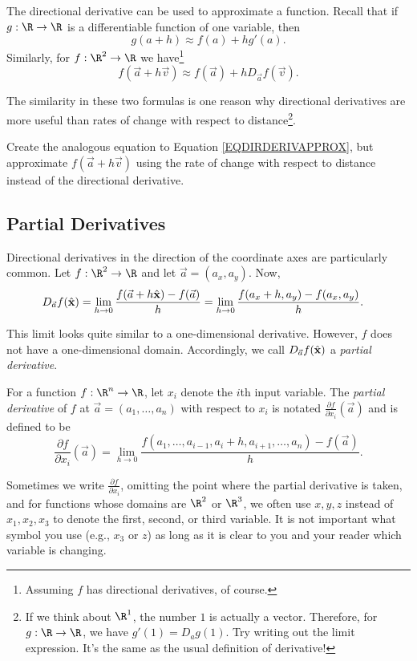 The directional derivative can be used to approximate a function.  Recall that if $g:\R\to\R$ is
a differentiable function of one variable, then
\[
	g(a+h)\approx f(a) + hg'(a).
\]
Similarly, for $f:\R^2\to\R$ we have\footnote{ Assuming $f$ has directional derivatives, of course.}
\begin{equation}
	\label{EQDIRDERIVAPPROX}
	f(\vec a+h\vec v)\approx f(\vec a)+hD_{\vec a}f(\vec v).
\end{equation}

The similarity in these two formulas is one reason
why directional derivatives are more useful than rates of change with respect to distance\footnote{
	If we think about $\R^1$, the number $1$ is actually a vector.  Therefore,
	for $g:\R\to\R$, we have $g'(1)=D_{a}g(1)$.  Try writing out the limit expression.  It's the same
	as the usual definition of derivative!
	}.

\begin{exercise}
	Create the analogous equation to Equation \eqref{EQDIRDERIVAPPROX}, but approximate
	$f(\vec a+h\vec v)$ using the rate of change with respect to distance instead of the
	directional derivative.
\end{exercise}


\subsection{Partial Derivatives}
Directional derivatives in the direction of the coordinate axes are particularly common.
Let $f:\R^2\to\R$ and let $\vec a=(a_x,a_y)$.  Now,
\begin{align*}
	D_{\vec a}f({\hat {\mathbf x}}) &= \lim_{h\to0}\frac{f(\vec a+h{\hat {\mathbf x}})-f(\vec a)}{h}
	=\lim_{h\to0}\frac{f(a_x+h, a_y)-f(a_x,a_y)}{h}.
\end{align*}

This limit looks quite similar to a one-dimensional derivative.  However, $f$ does not
have a one-dimensional domain.  Accordingly, we call $D_{\vec a}f({\hat {\mathbf x}})$ a 
\emph{partial derivative}.

\begin{definition}
	For a function $f:\R^n\to\R$, let $x_i$ denote the $i$th input variable.
	The \emph{partial derivative} of $f$ at $\vec a=(a_1,\ldots,a_n)$ with respect to $x_i$ is 
	notated $\frac{\partial f}{\partial x_i}(\vec a)$ and is defined to be
	\[
		\frac{\partial f}{\partial x_i}(\vec a) = 
		\lim_{h\to0}\frac{f(a_1,\ldots,a_{i-1},a_i+h,a_{i+1},\ldots,a_n)-f(\vec a)}{h}.
	\]
\end{definition}
Sometimes we write $\frac{\partial f}{\partial x_i}$, omitting the point where the partial
derivative is taken, and for functions whose domains are $\R^2$ or $\R^3$, we often use $x,y,z$ 
instead of $x_1,x_2,x_3$ to denote
the first, second, or third variable.  It is not important what symbol you use (e.g., 
$x_3$ or $z$) as long
as it is clear to you and your reader which variable is changing.

